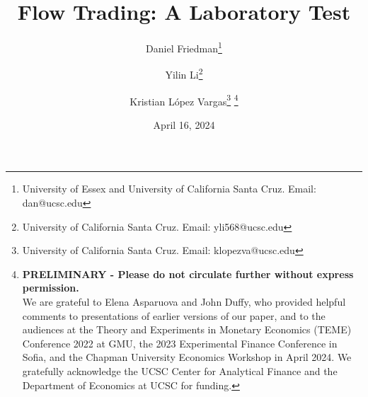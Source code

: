 


\title{Flow Trading: A Laboratory Test}

\author{
  Daniel Friedman\thanks{
  University of Essex and University of California Santa Cruz. Email: dan@ucsc.edu} 
\and
  Yilin Li\thanks{
  University of California Santa Cruz. Email: yli568@ucsc.edu} 
\and
  Kristian L\'opez Vargas\thanks{
  University of California Santa Cruz. Email: klopezva@ucsc.edu}
  \thanks{
  \textbf{PRELIMINARY - Please do not circulate further without express permission.}\\
    We are grateful to Elena Asparuova and John Duffy, who provided helpful comments to presentations of earlier versions of our paper,  
    and to the audiences at the Theory and Experiments in Monetary Economics (TEME) Conference 2022 at GMU, the 2023 Experimental Finance Conference in Sofia, and the Chapman University Economics Workshop in April 2024. We gratefully acknowledge the UCSC Center for Analytical Finance and the Department of Economics at UCSC for funding.}
}

\date{April 16, 2024}



\maketitle

